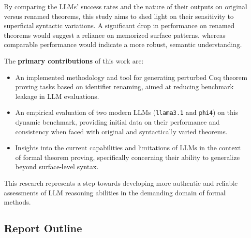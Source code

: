 By comparing the LLMs' success rates and the nature of their outputs on original versus renamed theorems, this study aims to shed light on their sensitivity to superficial syntactic variations. A significant drop in performance on renamed theorems would suggest a reliance on memorized surface patterns, whereas comparable performance would indicate a more robust, semantic understanding.

The \textbf{primary contributions} of this work are:
\begin{itemize}
    \item An implemented methodology and tool for generating perturbed Coq theorem proving tasks based on identifier renaming, aimed at reducing benchmark leakage in LLM evaluations.
    \item An empirical evaluation of two modern LLMs (\texttt{llama3.1} and \texttt{phi4}) on this dynamic benchmark, providing initial data on their performance and consistency when faced with original and syntactically varied theorems.
    \item Insights into the current capabilities and limitations of LLMs in the context of formal theorem proving, specifically concerning their ability to generalize beyond surface-level syntax.
\end{itemize}

This research represents a step towards developing more authentic and reliable assessments of LLM reasoning abilities in the demanding domain of formal methods.

\subsection{Report Outline}
\label{sec:intro_outline}


